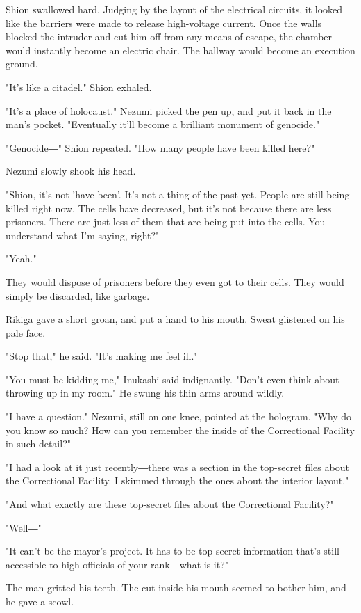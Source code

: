 Shion swallowed hard. Judging by the layout of the electrical circuits,
it looked like the barriers were made to release high-voltage current.
Once the walls blocked the intruder and cut him off from any means of
escape, the chamber would instantly become an electric chair. The
hallway would become an execution ground.

"It's like a citadel." Shion exhaled.

"It's a place of holocaust." Nezumi picked the pen up, and put it back
in the man's pocket. "Eventually it'll become a brilliant monument of
genocide."

"Genocide―" Shion repeated. "How many people have been killed here?"

Nezumi slowly shook his head.

"Shion, it's not 'have been'. It's not a thing of the past yet. People
are still being killed right now. The cells have decreased, but it's not
because there are less prisoners. There are just less of them that are
being put into the cells. You understand what I'm saying, right?"

"Yeah."

They would dispose of prisoners before they even got to their cells.
They would simply be discarded, like garbage.

Rikiga gave a short groan, and put a hand to his mouth. Sweat glistened
on his pale face.

"Stop that," he said. "It's making me feel ill."

"You must be kidding me," Inukashi said indignantly. "Don't even think
about throwing up in my room." He swung his thin arms around wildly.

"I have a question." Nezumi, still on one knee, pointed at the hologram.
"Why do you know so much? How can you remember the inside of the
Correctional Facility in such detail?"

"I had a look at it just recently―there was a section in the top-secret
files about the Correctional Facility. I skimmed through the ones about
the interior layout."

"And what exactly are these top-secret files about the Correctional
Facility?"

"Well―"

"It can't be the mayor's project. It has to be top-secret information
that's still accessible to high officials of your rank―what is it?"

The man gritted his teeth. The cut inside his mouth seemed to bother
him, and he gave a scowl.

